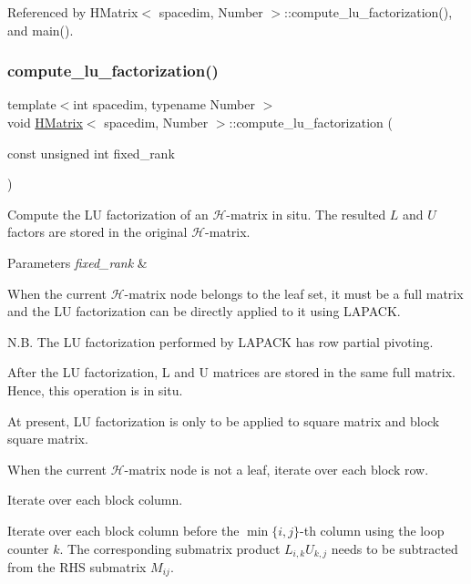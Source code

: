 Referenced by H\+Matrix$<$ spacedim, Number $>$\+::compute\+\_\+lu\+\_\+factorization(), and main().

\mbox{\label{classHMatrix_aba14c63550f42d8a971beab340337b0e}} 
\subsubsection{\texorpdfstring{compute\+\_\+lu\+\_\+factorization()}{compute\_lu\_factorization()}\hspace{0.1cm}{\footnotesize\ttfamily [2/2]}}
{\footnotesize\ttfamily template$<$int spacedim, typename Number $>$ \\
void \hyperlink{classHMatrix}{H\+Matrix}$<$ spacedim, Number $>$\+::compute\+\_\+lu\+\_\+factorization (\begin{DoxyParamCaption}\item[{const unsigned int}]{fixed\+\_\+rank }\end{DoxyParamCaption})}

Compute the LU factorization of an $\mathcal{H}$-\/matrix in situ. The resulted $L$ and $U$ factors are stored in the original $\mathcal{H}$-\/matrix.


\begin{DoxyParams}{Parameters}
{\em fixed\+\_\+rank} & \\
\hline
\end{DoxyParams}
When the current $\mathcal{H}$-\/matrix node belongs to the leaf set, it must be a full matrix and the LU factorization can be directly applied to it using L\+A\+P\+A\+CK.

N.\+B. The LU factorization performed by L\+A\+P\+A\+CK has row partial pivoting.

After the LU factorization, L and U matrices are stored in the same full matrix. Hence, this operation is in situ.

At present, LU factorization is only to be applied to square matrix and block square matrix.

When the current $\mathcal{H}$-\/matrix node is not a leaf, iterate over each block row.

Iterate over each block column.

Iterate over each block column before the $\min\{i, j\}$-\/th column using the loop counter $k$. The corresponding submatrix product $L_{i,k}U_{k,j}$ needs to be subtracted from the R\+HS submatrix $M_{ij}$.

